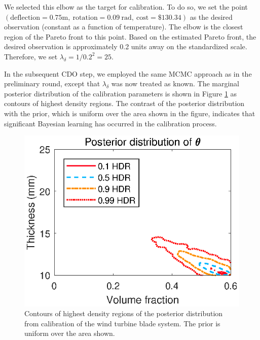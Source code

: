 \documentclass[12pt]{article}
\begin{document}
%
We selected this elbow as the target for calibration.
%
To do so, we set the point $(\mathrm{deflection}=0.75\mathrm m,\ 
\mathrm{rotation}=0.09\ \mathrm{rad},\ 
\mathrm{cost}=\$130.34)$
 as the desired observation (constant as a function of temperature).
%
The elbow is the closest region of the Pareto front to this point.
%
Based on the estimated Pareto front, the desired observation is approximately 0.2 units away on the standardized scale.
%
Therefore, we set $\lambda_\delta=1/0.2^2=25.$
%

In the subsequent CDO step, we employed the same MCMC approach as in the preliminary round, except that $\lambda_\delta$ was now treated as known.
%
The marginal posterior distribution of the calibration parameters is shown in Figure \ref{fig:wt_marg_post} as contours of highest density regions.
%
The contrast of the posterior distribution with the prior, which is uniform over the area shown in the figure, indicates that significant Bayesian learning has occurred in the calibration process.
%
\begin{figure}
\centering
\includegraphics[scale=0.8]{FIG_post_dist_contourplot}
\caption{Contours of highest density regions of the posterior distribution from calibration of the wind turbine blade system. The prior is uniform over the area shown.}
\label{fig:wt_marg_post}
\end{figure}
\end{document}
